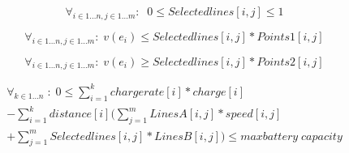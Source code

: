 \begin{equation}
\forall_{i\in1 \dots n, j \in 1 \dots m}: \; \;0\leq Selectedlines[i,j] \leq 1
\end{equation}

\begin{equation}
\forall_{i\in1 \dots n, j \in 1 \dots m}:\; v(e_i) \le Selectedlines[i,j] * Points1[i,j]
\end{equation}

\begin{equation}
\forall_{i\in1 \dots n, j \in 1 \dots m}:\; v(e_i) \ge Selectedlines[i,j] * Points2[i,j]
\end{equation}

\begin{equation}
\begin{split}
\forall_{k\in1 \dots n}\;:\;0 \le\sum_{i=1}^{k}chargerate[i]*charge[i]\\
-\sum_{i=1}^{k} distance[i](\sum_{j=1}^{m} LinesA[i,j]*speed[i,j]\\
+\sum_{j=1}^{m} Selectedlines[i,j]*LinesB[i,j]) \le maxbattery\;capacity
\end{split}
\end{equation}
